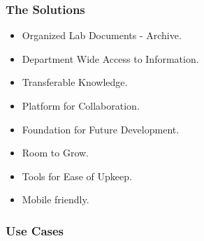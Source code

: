 \documentclass{beamer} %
\begin{document}

\begin{frame}
\frametitle{The Solutions}\color{black}
	\begin{itemize}
		\item Organized Lab Documents - Archive.
		\item Department Wide Access to Information.
		\item Transferable Knowledge.
		\item Platform for Collaboration.
		\item Foundation for Future Development.
		\item Room to Grow.
		\item Tools for Ease of Upkeep.
		\item Mobile friendly.
	\end{itemize}
\end{frame}

\begin{frame}
\frametitle{Use Cases}
\href{https://pjl.ucalgary.ca}{}
\end{frame}
\end{document}
